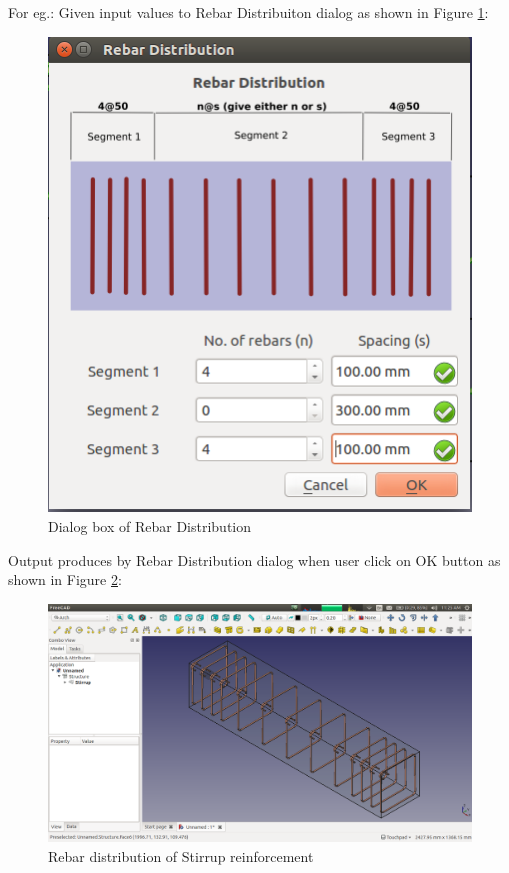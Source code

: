 For eg.: Given input values to Rebar Distribuiton dialog as shown in Figure \ref{rebardistributiondialog1}:

\begin{figure}
    \centering \includegraphics[scale=0.60]{images/RebarDistributionDialog.png}
    \caption{Dialog box of Rebar Distribution}
    \label{rebardistributiondialog1}
\end{figure}

Output produces by Rebar Distribution dialog when user click on OK button as shown in Figure \ref{rebardistribution1}:

\begin{figure}
    \centering \includegraphics[scale=0.35]{images/RebarDistribution.png}
    \caption{Rebar distribution of Stirrup reinforcement}
    \label{rebardistribution1}
\end{figure}

